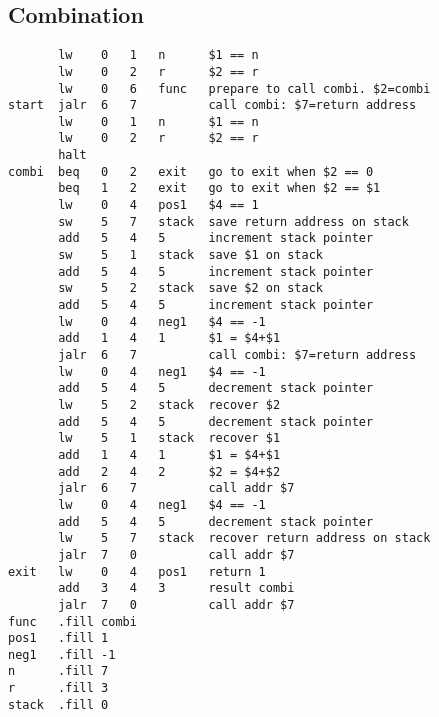 \documentclass{article}
\begin{document}
\subsection{Combination}
\begin{lstlisting}
       lw    0   1   n      $1 == n 
       lw    0   2   r      $2 == r
       lw    0   6   func   prepare to call combi. $2=combi 
start  jalr  6   7          call combi: $7=return address
       lw    0   1   n      $1 == n
       lw    0   2   r      $2 == r
       halt
combi  beq   0   2   exit   go to exit when $2 == 0
       beq   1   2   exit   go to exit when $2 == $1
       lw    0   4   pos1   $4 == 1
       sw    5   7   stack  save return address on stack
       add   5   4   5      increment stack pointer
       sw    5   1   stack  save $1 on stack
       add   5   4   5      increment stack pointer
       sw    5   2   stack  save $2 on stack
       add   5   4   5      increment stack pointer
       lw    0   4   neg1   $4 == -1
       add   1   4   1      $1 = $4+$1
       jalr  6   7          call combi: $7=return address
       lw    0   4   neg1   $4 == -1
       add   5   4   5      decrement stack pointer
       lw    5   2   stack  recover $2
       add   5   4   5      decrement stack pointer
       lw    5   1   stack  recover $1
       add   1   4   1      $1 = $4+$1
       add   2   4   2      $2 = $4+$2
       jalr  6   7          call addr $7
       lw    0   4   neg1   $4 == -1
       add   5   4   5      decrement stack pointer
       lw    5   7   stack  recover return address on stack
       jalr  7   0          call addr $7
exit   lw    0   4   pos1   return 1
       add   3   4   3      result combi
       jalr  7   0          call addr $7
func   .fill combi
pos1   .fill 1
neg1   .fill -1
n      .fill 7
r      .fill 3
stack  .fill 0
    
\end{lstlisting}
\end{document}
